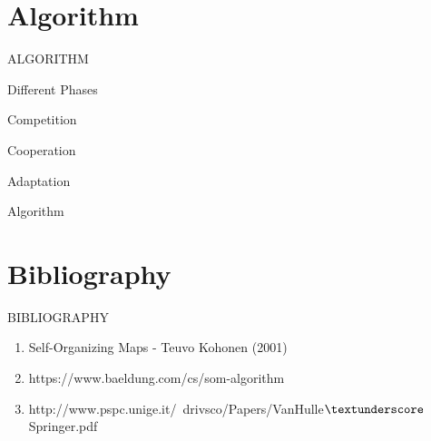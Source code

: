 \documentclass{beamer}
\begin{document}
\section{Algorithm}

	\begin{frame}
	
		\begin{center}
			
			\Huge ALGORITHM
		\end{center}
	\end{frame}


	\begin{frame}{Different Phases}
	
		\begin{block}{Competition}
		
		
		\end{block}

	
		\begin{block}{Cooperation}

	
		\end{block}


		\begin{block}{Adaptation}
	

		\end{block}
	\end{frame}


	\begin{frame}{Algorithm}
		
	







	
		
	
	\end{frame}
	


\section{Bibliography}
	
	\begin{frame}
	
		\begin{center}

			\Huge BIBLIOGRAPHY
		\end{center}
	\end{frame}


	\begin{frame}
	
		\begin{enumerate}
			
			\item Self-Organizing Maps - Teuvo Kohonen (2001)
			\item https://www.baeldung.com/cs/som-algorithm
			\item http://www.pspc.unige.it/~drivsco/Papers/VanHulle$\textunderscore$Springer.pdf
		\end{enumerate}
	\end{frame}
\end{document}
